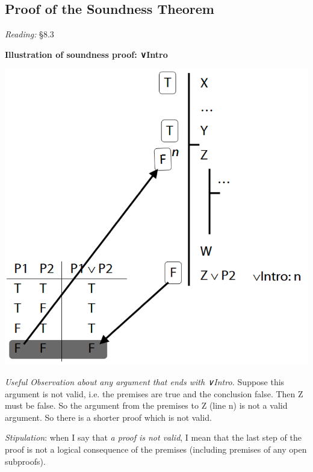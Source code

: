 \documentclass[12pt]{extarticle}
\begin{document}
\begin{multicols*}{3}
 
\section{Proof of the Soundness Theorem}
 
\emph{Reading:} §8.3
 
\begin{minipage}{\columnwidth}
 
\textbf{Illustration of soundness proof: ∨Intro}
 
\begin{center}
\includegraphics[scale=0.3]{img/soundness_or.png}
\end{center}
\end{minipage}
 
\emph{Useful Observation about any argument that ends with ∨Intro.} Suppose this argument is not valid, i.e. the premises are true and the conclusion false. Then Z must be false. So the argument from the premises to Z (line n) is not a valid argument. So there is a shorter proof which is not valid.
 
\emph{Stipulation}: when I say that \emph{a proof is not valid}, I mean that the last step of the proof is not a logical consequence of the premises (including premises of any open subproofs).
 
\begin{minipage}{\columnwidth}
 

\end{minipage}
\end{multicols*}
\end{document}
